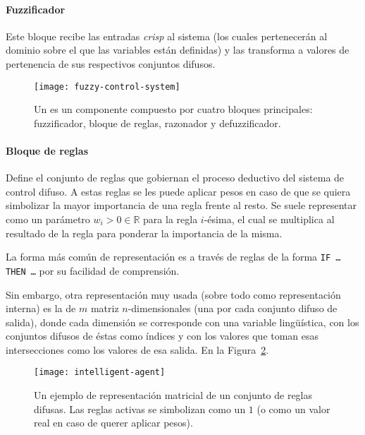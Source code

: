 \paragraph{Fuzzificador}

Este bloque recibe las entradas \textit{crisp} al sistema (los cuales pertenecerán al dominio sobre el que las variables están definidas) y las transforma a valores de pertenencia de sus respectivos conjuntos difusos.

\begin{figure}[t]
	\centering
	\texttt{[image: fuzzy-control-system]}
	\caption[Esquema de un ]{Un  es un componente compuesto por cuatro bloques principales: fuzzificador, bloque de reglas, razonador y defuzzificador.}
	\label{fig:fuzzy-control-system}
\end{figure}

\paragraph{Bloque de reglas}

Define el conjunto de reglas que gobiernan el proceso deductivo del sistema de control difuso. A estas reglas se les puede aplicar pesos en caso de que se quiera simbolizar la mayor importancia de una regla frente al resto. Se suele representar como un parámetro $w_i > 0 \in \mathbb{R}$ para la regla $i$-ésima, el cual se multiplica al resultado de la regla para ponderar la importancia de la misma.

La forma más común de representación es a través de reglas de la forma \texttt{IF \ldots THEN \ldots} por su facilidad de comprensión.

Sin embargo, otra representación muy usada (sobre todo como representación interna) es la de $m$ matriz $n$-dimensionales (una por cada conjunto difuso de salida), donde cada dimensión se corresponde con una variable lingüística, con los conjuntos difusos de éstas como índices y con los valores que toman esas intersecciones como los valores de esa salida. En la Figura~\ref{fig:fuzzy-controller-matrix-representation}.

\begin{figure}[!b]
	\centering
	\texttt{[image: intelligent-agent]}
	\caption[Matriz de representación de reglas difusas]{Un ejemplo de representación matricial de un conjunto de reglas difusas. Las reglas activas se simbolizan como un $1$ (o como un valor real en caso de querer aplicar pesos).}
	\label{fig:fuzzy-controller-matrix-representation}
\end{figure}

